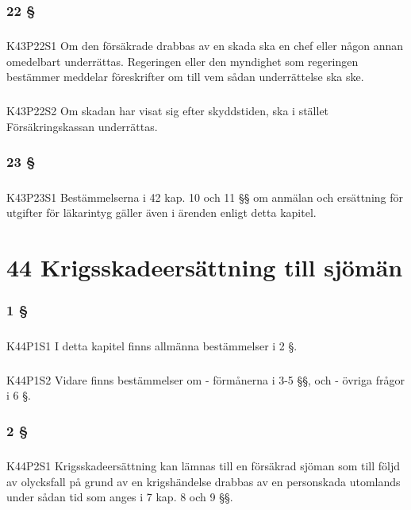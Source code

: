 \documentclass[a4paper,notitlepage,openany,10pt]{book}
\begin{document}
\subsection*{22 §}
\paragraph*{}
{\tiny K43P22S1}
Om den försäkrade drabbas av en skada ska en chef eller någon annan omedelbart underrättas. Regeringen eller den myndighet som regeringen bestämmer meddelar föreskrifter om till vem sådan underrättelse ska ske.
\paragraph*{}
{\tiny K43P22S2}
Om skadan har visat sig efter skyddstiden, ska i stället Försäkringskassan underrättas.
\subsection*{23 §}
\paragraph*{}
{\tiny K43P23S1}
Bestämmelserna i 42 kap. 10 och 11 §§ om anmälan och ersättning för utgifter för läkarintyg gäller även i ärenden enligt detta kapitel.
\chapter*{44 Krigsskadeersättning till sjömän}
\subsection*{1 §}
\paragraph*{}
{\tiny K44P1S1}
I detta kapitel finns allmänna bestämmelser i 2 §.
\paragraph*{}
{\tiny K44P1S2}
Vidare finns bestämmelser om
\newline - förmånerna i 3-5 §§, och
\newline - övriga frågor i 6 §.
\subsection*{2 §}
\paragraph*{}
{\tiny K44P2S1}
Krigsskadeersättning kan lämnas till en försäkrad sjöman som till följd av olycksfall på grund av en krigshändelse drabbas av en personskada utomlands under sådan tid som anges i 7 kap. 8 och 9 §§.
\end{document}
